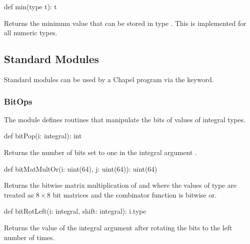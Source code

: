 \begin{protohead}
def min(type t): t
\end{protohead}
\begin{protobody}
Returns the minimum value that can be stored in type .  This
is implemented for all numeric types.
\end{protobody}



\subsection{Standard Modules}

Standard modules can be used by a Chapel program via the 
keyword.

\subsubsection{BitOps}
\label{BitOps}

The module  defines routines that manipulate the bits of
values of integral types.

\vspace{1pc}

\begin{protohead}
def bitPop(i: integral): int
\end{protohead}
\begin{protobody}
Returns the number of bits set to one in the integral
argument .
\end{protobody}

\begin{protohead}
def bitMatMultOr(i: uint(64), j: uint(64)): uint(64)
\end{protohead}
\begin{protobody}
Returns the bitwise matrix multiplication of  and 
where the values of  type are treated as $8 \times 8$
bit matrices and the combinator function is bitwise or.
\end{protobody}

\begin{protohead}
def bitRotLeft(i: integral, shift: integral): i.type
\end{protohead}
\begin{protobody}
Returns the value of the integral argument  after rotating the
bits to the left  number of times.
\end{protobody}

